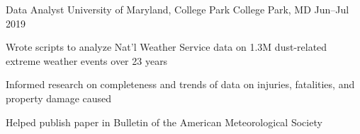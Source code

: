 \experience
{Data Analyst}
{University of Maryland, College Park}
{College Park, MD}
{Jun--Jul 2019}
{
	\item Wrote scripts to analyze Nat'l Weather Service data on 1.3M dust-related extreme weather events over 23 years
	\item Informed research on completeness and trends of data on injuries, fatalities, and property damage caused
	\item Helped publish paper in Bulletin of the American Meteorological Society
}
